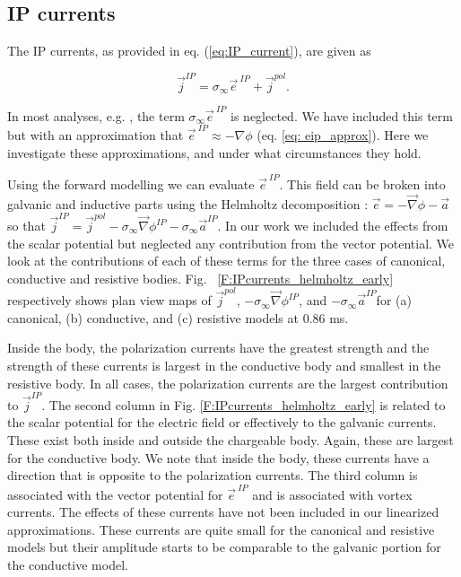 \documentclass[extra,mreferee]{gji}
\newcommand{\grad}{\vec \nabla}
\newcommand{\siginf}{\sigma_\infty}
\renewcommand {\j}  { {\vec j} }
\newcommand {\e}  { {\vec e} }
\begin{document}
\subsection{IP currents}
The IP currents, as provided in eq. (\ref{eq:IP_current}), are given as
\begin{linenomath*}
\begin{equation}
  \j^{IP}=\siginf  \e^{\ IP} + \j^{pol}.
\end{equation}
\end{linenomath*}

In most analyses, e.g. \cite{Smith1988a}, the term $\siginf \e^{\ IP}$ is neglected. We have included this term but with an approximation that $\e^{\ IP} \approx -\nabla \phi$  (eq. \ref{eq: eip_approx}). Here we investigate these approximations, and under what circumstances they hold.

Using the forward modelling we can evaluate $\e^{\ IP}$.
This field can be broken into galvanic and inductive parts using the Helmholtz decomposition \cite[]{Bladel}: $\e=-\grad \phi-\vec{a}$ so that $\j^{IP} = \j^{pol} -\siginf \grad\phi^{IP} - \siginf \vec{a}^{IP}$.
In our work we included the effects from the scalar potential but neglected any contribution from the vector potential. We look at the contributions of each of these terms  for the three cases of canonical, conductive and resistive bodies.
Fig. ~\ref{F:IPcurrents_helmholtz_early} respectively shows plan view maps of $\j^{pol}$, $-\siginf \grad\phi^{IP}$, and $-\siginf \vec{a}^{IP}$for (a) canonical, (b) conductive, and (c) resistive models at 0.86 ms.

Inside the body, the polarization currents have the greatest strength and the strength of these currents is largest in the conductive body and smallest in the resistive body.
In all cases, the polarization currents are the largest contribution to $\j^{IP}$.
The second column in Fig. \ref{F:IPcurrents_helmholtz_early} is related to the scalar potential for the electric field or effectively to the galvanic currents.
These exist both inside and outside the chargeable body.
Again, these are largest for the conductive body.
We note that inside the body, these currents have a direction that is opposite to the polarization currents.
The third column is associated with the vector potential for $\e^{\ IP}$ and is associated with vortex currents.
The effects of these currents have not been included in our linearized approximations. These currents are quite small for the canonical and resistive models but their amplitude starts to be comparable to the galvanic portion for the conductive model.
\end{document}
